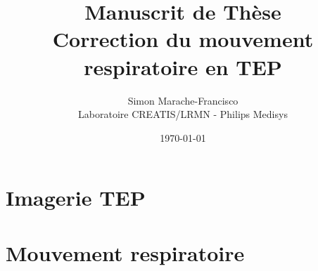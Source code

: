 \documentclass[12pt]{book}
\title{\Huge{Manuscrit de Thèse}\\\Large{Correction du mouvement respiratoire en TEP}}
\author{
        Simon Marache-Francisco \\
        Laboratoire CREATIS/LRMN - Philips Medisys
}
\date{\today}
\begin{document}
\addtolength{\parskip}{0.5em}




\newcommand{\todo}[1]{
\addcontentsline{toc}{subsection}{\textbf{Todo:} #1}
$\|$\textbf{A Faire : }#1$\|$
}



\maketitle

\thispagestyle{empty}



\newpage

\tableofcontents


\newpage
{}
	

\part{Imagerie TEP}
		
			

\part{Mouvement respiratoire}
%	
\end{document}
